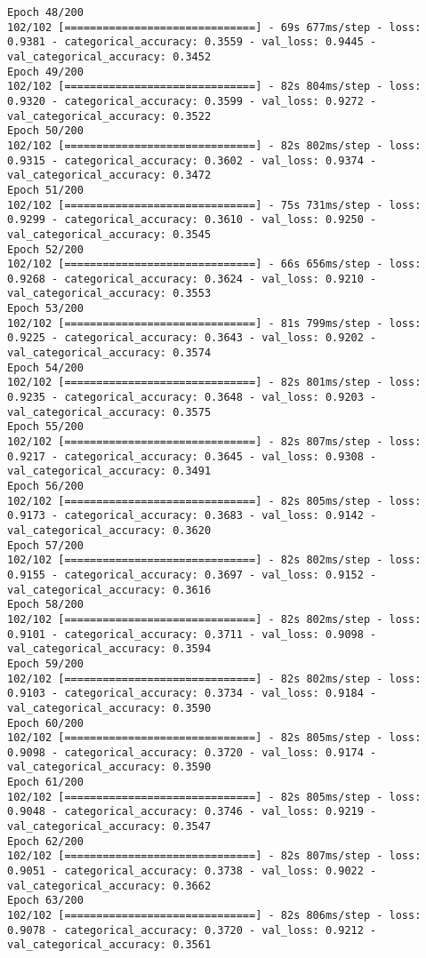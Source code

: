 \begin{lstlisting}
Epoch 48/200
102/102 [==============================] - 69s 677ms/step - loss: 0.9381 - categorical_accuracy: 0.3559 - val_loss: 0.9445 - val_categorical_accuracy: 0.3452
Epoch 49/200
102/102 [==============================] - 82s 804ms/step - loss: 0.9320 - categorical_accuracy: 0.3599 - val_loss: 0.9272 - val_categorical_accuracy: 0.3522
Epoch 50/200
102/102 [==============================] - 82s 802ms/step - loss: 0.9315 - categorical_accuracy: 0.3602 - val_loss: 0.9374 - val_categorical_accuracy: 0.3472
Epoch 51/200
102/102 [==============================] - 75s 731ms/step - loss: 0.9299 - categorical_accuracy: 0.3610 - val_loss: 0.9250 - val_categorical_accuracy: 0.3545
Epoch 52/200
102/102 [==============================] - 66s 656ms/step - loss: 0.9268 - categorical_accuracy: 0.3624 - val_loss: 0.9210 - val_categorical_accuracy: 0.3553
Epoch 53/200
102/102 [==============================] - 81s 799ms/step - loss: 0.9225 - categorical_accuracy: 0.3643 - val_loss: 0.9202 - val_categorical_accuracy: 0.3574
Epoch 54/200
102/102 [==============================] - 82s 801ms/step - loss: 0.9235 - categorical_accuracy: 0.3648 - val_loss: 0.9203 - val_categorical_accuracy: 0.3575
Epoch 55/200
102/102 [==============================] - 82s 807ms/step - loss: 0.9217 - categorical_accuracy: 0.3645 - val_loss: 0.9308 - val_categorical_accuracy: 0.3491
Epoch 56/200
102/102 [==============================] - 82s 805ms/step - loss: 0.9173 - categorical_accuracy: 0.3683 - val_loss: 0.9142 - val_categorical_accuracy: 0.3620
Epoch 57/200
102/102 [==============================] - 82s 802ms/step - loss: 0.9155 - categorical_accuracy: 0.3697 - val_loss: 0.9152 - val_categorical_accuracy: 0.3616
Epoch 58/200
102/102 [==============================] - 82s 802ms/step - loss: 0.9101 - categorical_accuracy: 0.3711 - val_loss: 0.9098 - val_categorical_accuracy: 0.3594
Epoch 59/200
102/102 [==============================] - 82s 802ms/step - loss: 0.9103 - categorical_accuracy: 0.3734 - val_loss: 0.9184 - val_categorical_accuracy: 0.3590
Epoch 60/200
102/102 [==============================] - 82s 805ms/step - loss: 0.9098 - categorical_accuracy: 0.3720 - val_loss: 0.9174 - val_categorical_accuracy: 0.3590
Epoch 61/200
102/102 [==============================] - 82s 805ms/step - loss: 0.9048 - categorical_accuracy: 0.3746 - val_loss: 0.9219 - val_categorical_accuracy: 0.3547
Epoch 62/200
102/102 [==============================] - 82s 807ms/step - loss: 0.9051 - categorical_accuracy: 0.3738 - val_loss: 0.9022 - val_categorical_accuracy: 0.3662
Epoch 63/200
102/102 [==============================] - 82s 806ms/step - loss: 0.9078 - categorical_accuracy: 0.3720 - val_loss: 0.9212 - val_categorical_accuracy: 0.3561

\end{lstlisting}
